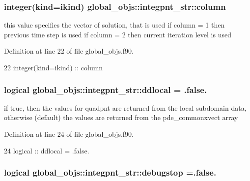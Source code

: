 \subsubsection[{column}]{\setlength{\rightskip}{0pt plus 5cm}integer(kind=ikind) global\+\_\+objs\+::integpnt\+\_\+str\+::column}\label{structglobal__objs_1_1integpnt__str_a7bc96803f7da2ba23a20339b30131351}


this value specifies the vector of solution, that is used if column = 1 then previous time step is used if column = 2 then current iteration level is used 



Definition at line 22 of file global\+\_\+objs.\+f90.


\begin{DoxyCode}
22     \textcolor{keywordtype}{integer(kind=ikind)} :: column
\end{DoxyCode}
\subsubsection[{ddlocal}]{\setlength{\rightskip}{0pt plus 5cm}logical global\+\_\+objs\+::integpnt\+\_\+str\+::ddlocal = .false.}\label{structglobal__objs_1_1integpnt__str_a29251b20b428a412a572c74aa98df715}


if true, then the values for quadpnt are returned from the local subdomain data, otherwise (default) the values are returned from the pde\+\_\+commonxvect array 



Definition at line 24 of file global\+\_\+objs.\+f90.


\begin{DoxyCode}
24     \textcolor{keywordtype}{logical} :: ddlocal = .false.
\end{DoxyCode}
\subsubsection[{debugstop}]{\setlength{\rightskip}{0pt plus 5cm}logical global\+\_\+objs\+::integpnt\+\_\+str\+::debugstop =.false.}\label{structglobal__objs_1_1integpnt__str_a79eedb4e2d7eaf7cef9401e973368cb4}


